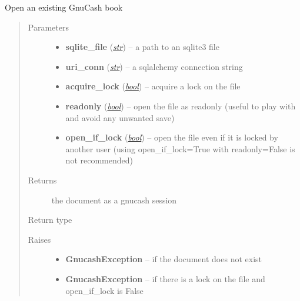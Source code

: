 \documentclass[letterpaper,10pt,english]{sphinxmanual}
\begin{document}

\begin{fulllineitems}
\label{api/piecash.model_core.session:piecash.model_core.session.open_book}
Open an existing GnuCash book
\begin{quote}\begin{description}
\item[{Parameters}] \leavevmode\begin{itemize}
\item {} 
\textbf{sqlite\_file} (\href{http://docs.python.org/library/functions.html\#str}{\emph{str}}) -- a path to an sqlite3 file

\item {} 
\textbf{uri\_conn} (\href{http://docs.python.org/library/functions.html\#str}{\emph{str}}) -- a sqlalchemy connection string

\item {} 
\textbf{acquire\_lock} (\href{http://docs.python.org/library/functions.html\#bool}{\emph{bool}}) -- acquire a lock on the file

\item {} 
\textbf{readonly} (\href{http://docs.python.org/library/functions.html\#bool}{\emph{bool}}) -- open the file as readonly (useful to play with and avoid any unwanted save)

\item {} 
\textbf{open\_if\_lock} (\href{http://docs.python.org/library/functions.html\#bool}{\emph{bool}}) -- open the file even if it is locked by another user
(using open\_if\_lock=True with readonly=False is not recommended)

\end{itemize}

\item[{Returns}] \leavevmode
the document as a gnucash session

\item[{Return type}] \leavevmode
{\hyperref[api/piecash.model_core.session:piecash.model_core.session.GncSession]{}}

\item[{Raises}] \leavevmode\begin{itemize}
\item {} 
\textbf{GnucashException} -- if the document does not exist

\item {} 
\textbf{GnucashException} -- if there is a lock on the file and open\_if\_lock is False

\end{itemize}

\end{description}\end{quote}

\end{fulllineitems}
\end{document}
